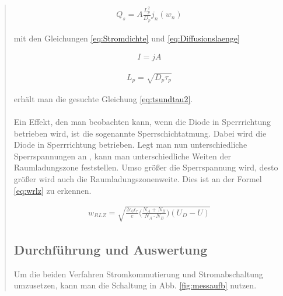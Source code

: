 \begin{quote}
    \begin{equation}
         \begin{split}
             Q_{s}=A\frac{L_{p}^{2}}{D_p}j_{n}(w_n)
             \end{split}
         \label{eq:blalbl}
    \end{equation}

    mit den Gleichungen \ref{eq:Stromdichte} und \ref{eq:Diffusionslaenge}

    \begin{equation}
         \begin{split}
             I=jA
             \end{split}
         \label{eq:Stromdichte}
    \end{equation}

    \begin{equation}
         \begin{split}
             L_{p}=\sqrt{D_{p}\tau_{p}}
             \end{split}
         \label{eq:Diffusionslaenge}
    \end{equation}

    erhält man die gesuchte Gleichung \ref{eq:tsundtau2}.\\
    \\
    Ein Effekt, den man beobachten kann, wenn die Diode in Sperrrichtung
    betrieben wird, ist die sogenannte Sperrschichtatmung. Dabei wird die Diode
    in Sperrrichtung betrieben. Legt man nun unterschiedliche Sperrspannungen an
    , kann man unterschiedliche Weiten der Raumladungszone feststellen. Umso
    größer die Sperrspannung wird, desto größer wird auch die
    Raumladungszonenweite. Dies ist an der Formel \ref{eq:wrlz} zu erkennen.

     \begin{equation}
         \begin{split}
             w_{RLZ}=\sqrt{\frac{2\epsilon_{0}\epsilon_{r}}{e}\bigg(\frac{N_{A}+N_{B}}{N_{A}\cdot N_{B}}\bigg)(U_{D}-U)}
             \end{split}
         \label{eq:wrlz}
    \end{equation}

  \subsection{Durchführung und Auswertung}

     Um die beiden Verfahren Stromkommutierung und Stromabschaltung umzusetzen,
     kann man die Schaltung in Abb. \ref{fig:messaufb} nutzen.


\end{quote}
